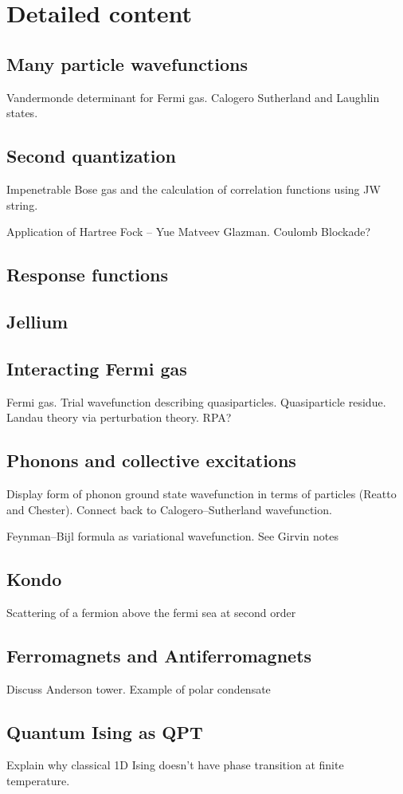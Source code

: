 \section{Detailed content}

\subsection{Many particle wavefunctions}

Vandermonde determinant for Fermi gas. Calogero Sutherland and Laughlin states.

\subsection{Second quantization}

Impenetrable Bose gas and the calculation of correlation functions using JW string.

Application of Hartree Fock -- Yue Matveev Glazman. Coulomb Blockade?

\subsection{Response functions}

\subsection{Jellium}


\subsection{Interacting Fermi gas}

Fermi gas. Trial wavefunction describing quasiparticles. Quasiparticle residue. Landau theory via perturbation theory. RPA?

\subsection{Phonons and collective excitations}

Display form of phonon ground state wavefunction in terms of particles (Reatto and Chester). Connect back to Calogero--Sutherland wavefunction. 

Feynman--Bijl formula as variational wavefunction. See Girvin notes

\subsection{Kondo}

Scattering of a fermion above the fermi sea at second order

\subsection{Ferromagnets and Antiferromagnets}

Discuss Anderson tower. Example of polar condensate

\subsection{Quantum Ising as QPT}

Explain why classical 1D Ising doesn't have phase transition at finite temperature.